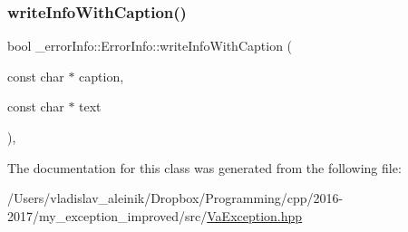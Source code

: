 \subsubsection{\texorpdfstring{write\+Info\+With\+Caption()}{writeInfoWithCaption()}}
{\footnotesize\ttfamily bool \+\_\+error\+Info\+::\+Error\+Info\+::write\+Info\+With\+Caption (\begin{DoxyParamCaption}\item[{const char $\ast$}]{caption,  }\item[{const char $\ast$}]{text }\end{DoxyParamCaption})\hspace{0.3cm}{\ttfamily [inline]}, {\ttfamily [noexcept]}}



The documentation for this class was generated from the following file\+:\begin{DoxyCompactItemize}
\item 
/\+Users/vladislav\+\_\+aleinik/\+Dropbox/\+Programming/cpp/2016-\/2017/my\+\_\+exception\+\_\+improved/src/\hyperlink{_va_exception_8hpp}{Va\+Exception.\+hpp}\end{DoxyCompactItemize}
